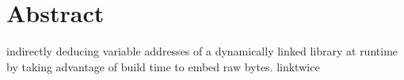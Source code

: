\chapter*{Abstract}\label{cha:abstract}
indirectly deducing variable addresses of a dynamically linked library at runtime  by taking advantage of build time to embed raw bytes. linktwice